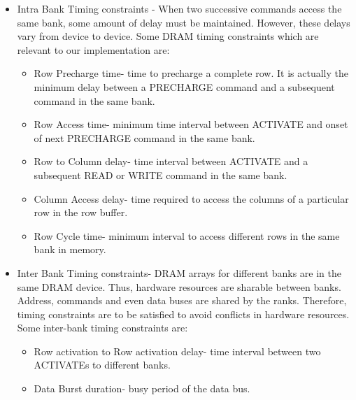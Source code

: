 \begin{itemize}

\item Intra Bank Timing constraints - When two successive commands access the same bank, some amount of delay must be maintained.
However, these delays vary from device to device. Some DRAM timing constraints which are relevant to our implementation are:

\begin{itemize}
\item Row Precharge time- time to precharge a complete row. It is actually the minimum delay between a PRECHARGE command and a subsequent command in the same bank.

\item Row Access time- minimum time interval between ACTIVATE and onset of next PRECHARGE command in the same bank.

\item Row to Column delay- time interval between ACTIVATE and a subsequent READ or WRITE command in the same bank.

\item Column Access delay- time required to access the columns of a particular row in the row buffer.

\item Row Cycle time- minimum interval to access different rows in the same bank in memory.
\end{itemize}

\item Inter Bank Timing constraints- DRAM arrays for different banks are in the same DRAM device. Thus, hardware resources are 
sharable between banks. Address, commands and even data buses are shared by the ranks. Therefore, timing constraints are 
to be satisfied to avoid conflicts in hardware resources. Some inter-bank timing constraints are:
\begin{itemize}

\item Row activation to Row activation delay- time interval between two ACTIVATEs to different banks.

\item Data Burst duration- busy period of the data bus.
\end{itemize}
\end{itemize}

